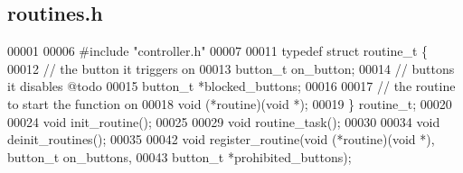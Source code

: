 \subsection{routines.\+h}
\label{routines_8h_source}

\begin{DoxyCode}
00001 
00006 \textcolor{preprocessor}{#include "controller.h"}
00007 
00011 \textcolor{keyword}{typedef} \textcolor{keyword}{struct }routine_t \{
00012     \textcolor{comment}{// the button it triggers on}
00013     button_t on_button;
00014     \textcolor{comment}{// buttons it disables @todo}
00015     button_t *blocked_buttons;
00016 
00017     \textcolor{comment}{// the routine to start the function on}
00018     void (*routine)(\textcolor{keywordtype}{void} *);
00019 \} routine_t;
00020 
00024 \textcolor{keywordtype}{void} init_routine();
00025 
00029 \textcolor{keywordtype}{void} routine_task();
00030 
00034 \textcolor{keywordtype}{void} deinit_routines();
00035 
00042 \textcolor{keywordtype}{void} register_routine(\textcolor{keywordtype}{void} (*routine)(\textcolor{keywordtype}{void} *), button_t on\_buttons,
00043                       button_t *prohibited\_buttons);
\end{DoxyCode}
